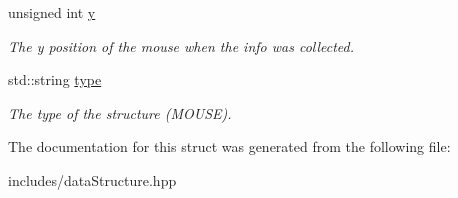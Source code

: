 \begin{DoxyCompactItemize}
unsigned int \hyperlink{structt__mouse_aa08a4efb666d232849ad00d40b284465}{y}
\begin{DoxyCompactList}\small\item\em The y position of the mouse when the info was collected. \end{DoxyCompactList}\item 
\mbox{\label{structt__mouse_ab97069f80b817be163e47bf5ded02067}} 
std\+::string \hyperlink{structt__mouse_ab97069f80b817be163e47bf5ded02067}{type}
\begin{DoxyCompactList}\small\item\em The type of the structure (M\+O\+U\+SE). \end{DoxyCompactList}\end{DoxyCompactItemize}


The documentation for this struct was generated from the following file\+:\begin{DoxyCompactItemize}
\item 
includes/data\+Structure.\+hpp\end{DoxyCompactItemize}
